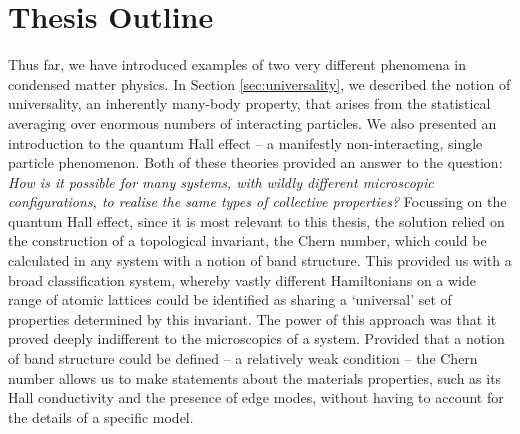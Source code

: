 \section{Thesis Outline}

Thus far, we have introduced examples of two very different phenomena in condensed matter physics. In Section \ref{sec:universality}, we described the notion of universality, an inherently many-body property, that arises from the statistical averaging over enormous numbers of interacting particles. We also presented an introduction to the quantum Hall effect -- a manifestly non-interacting, single particle phenomenon. Both of these theories provided an answer to the question: \textit{How is it possible for many systems, with wildly different microscopic configurations, to realise the same types of collective properties?} Focussing on the quantum Hall effect, since it is most relevant to this thesis, the solution relied on the construction of a topological invariant, the Chern number, which could be calculated in any system with a notion of band structure. This provided us with a broad classification system, whereby vastly different Hamiltonians on a wide range of atomic lattices could be identified as sharing a `universal' set of properties determined by this invariant. The power of this approach was that it proved deeply indifferent to the microscopics of a system. Provided that a notion of band structure could be defined -- a relatively weak condition -- the Chern number allows us to make statements about the materials properties, such as its Hall conductivity and the presence of edge modes, without having to account for the details of a specific model.

